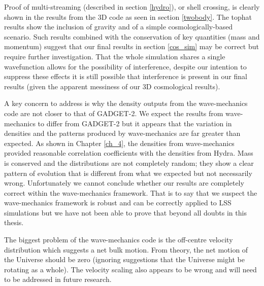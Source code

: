 Proof of multi-streaming (described in section \ref{hydro}), or shell crossing, is clearly shown in the results from the 3D code as seen in section \ref{twobody}. The tophat results show the inclusion of gravity and of a simple cosmologically-based scenario. Such results combined with the conservation of key quantities (mass and momentum) suggest that our final results in section \ref{cos_sim} may be correct but require further investigation. That the whole simulation shares a single wavefunction allows for the possibility of interference, despite our intention to suppress these effects it is still possible that interference is present in our final results (given the apparent messiness of our 3D cosmological results).

A key concern to address is why the density outputs from the wave-mechanics code are not closer to that of GADGET-2. We expect the results from wave-mechanics to differ from GADGET-2 but it appears that the variation in densities and the patterns produced by wave-mechanics are far greater than expected. As shown in Chapter \ref{ch_4}, the densities from wave-mechanics provided reasonable correlation coefficients with the densities from Hydra. Mass is conserved and the distributions are not completely random; they show a clear pattern of evolution that is different from what we expected but not necessarily wrong. Unfortunately we cannot conclude whether our results are completely correct within the wave-mechanics framework. That is to say that we suspect the wave-mechanics framework is robust and can be correctly applied to LSS simulations but we have not been able to prove that beyond all doubts in this thesis. 

The biggest problem of the wave-mechanics code is the off-centre velocity distribution which suggests a net bulk motion. From theory, the net motion of the Universe should be zero (ignoring suggestions that the Universe might be rotating as a whole). The velocity scaling also appears to be wrong and will need to be addressed in future research.


